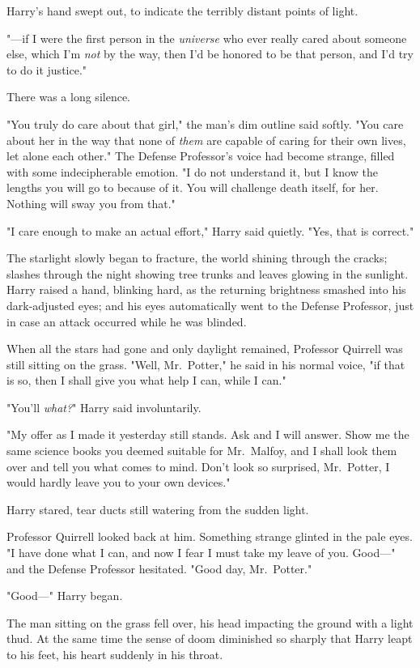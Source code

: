 Harry's hand swept out, to indicate the terribly distant points of light.

"---if I were the first person in the \emph{universe} who ever really cared
about someone else, which I'm \emph{not} by the way, then I'd be honored to be
that person, and I'd try to do it justice."

There was a long silence.

"You truly do care about that girl," the man's dim outline said softly. "You
care about her in the way that none of \emph{them} are capable of caring for
their own lives, let alone each other." The Defense Professor's voice had
become strange, filled with some indecipherable emotion. "I do not understand
it, but I know the lengths you will go to because of it. You will challenge
death itself, for her. Nothing will sway you from that."

"I care enough to make an actual effort," Harry said quietly. "Yes, that is
correct."

The starlight slowly began to fracture, the world shining through the cracks;
slashes through the night showing tree trunks and leaves glowing in the
sunlight. Harry raised a hand, blinking hard, as the returning brightness
smashed into his dark-adjusted eyes; and his eyes automatically went to the
Defense Professor, just in case an attack occurred while he was blinded.

When all the stars had gone and only daylight remained, Professor Quirrell was
still sitting on the grass. "Well, Mr.~Potter," he said in his normal voice,
"if that is so, then I shall give you what help I can, while I can."

"You'll \emph{what?}" Harry said involuntarily.

"My offer as I made it yesterday still stands. Ask and I will answer. Show me
the same science books you deemed suitable for Mr.~Malfoy, and I shall look
them over and tell you what comes to mind. Don't look so surprised, Mr.~Potter,
I would hardly leave you to your own devices."

Harry stared, tear ducts still watering from the sudden light.

Professor Quirrell looked back at him. Something strange glinted in the pale
eyes. "I have done what I can, and now I fear I must take my leave of you.
Good---" and the Defense Professor hesitated. "Good day, Mr.~Potter."

"Good---" Harry began.

The man sitting on the grass fell over, his head impacting the ground with a
light thud. At the same time the sense of doom diminished so sharply that Harry
leapt to his feet, his heart suddenly in his throat.

